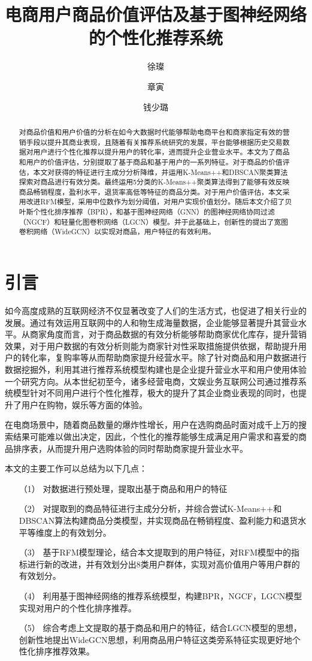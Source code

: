 \documentclass[lang=cn,11pt,a4paper,cite=authoryear]{elegantpaper}
\title{电商用户商品价值评估及基于图神经网络的个性化推荐系统}
\author{徐璨 \and 章寅 \and 钱少璐}
\institute{浙江工商大学}
\date{\zhtoday}
\begin{document}
\maketitle

\begin{abstract}
  对商品价值和用户价值的分析在如今大数据时代能够帮助电商平台和商家指定有效的营销手段以提升其商业表现，且随着有关推荐系统研究的发展，平台能够根据历史交易数据对用户进行个性化推荐以提升用户的转化率，进而提升企业营业水平。本文为了商品和用户的价值评估，分别提取了基于商品和基于用户的一系列特征。对于商品的价值评估，本文对获得的特征进行主成分分析降维，并运用K-Means++和DBSCAN聚类算法探索对商品进行有效分类。最终运用5分类的K-Means++聚类算法得到了能够有效反映商品畅销程度，盈利水平，退货率高低等特征的商品分类。对于用户价值评估，本文采用改进RFM模型，采用中位数作为划分阈值，对用户实现价值划分。随后本文介绍了贝叶斯个性化排序推荐（BPR），和基于图神经网络（GNN）的图神经网络协同过滤（NGCF）和轻量化图卷积网络（LGCN）模型。并于此基础上，创新性的提出了宽图卷积网络（WideGCN）以实现对商品，用户特征的有效利用。
\end{abstract}


\section{引言}
如今高度成熟的互联网经济不仅显著改变了人们的生活方式，也促进了相关行业的发展。通过有效运用互联网中的人和物生成海量数据，企业能够显著提升其营业水平。从商家角度而言，对于商品数据的有效分析能够帮助商家优化库存，提升营销效果，对于用户数据的有效分析则能为商家针对性采取措施提供依据，帮助提升用户的转化率，复购率等从而帮助商家提升经营水平。除了针对商品和用户数据进行数据挖掘外，利用其进行推荐系统模型构建也是企业提升营业水平和用户使用体验一个研究方向。从本世纪初至今，诸多经营电商，文娱业务互联网公司通过推荐系统模型针对不同用户进行个性化推荐，极大的提升了其企业商业表现的同时，也提升了用户在购物，娱乐等方面的体验。

在电商场景中，随着商品数量的爆炸性增长，用户在选购商品时面对成千上万的搜索结果可能难以做出决定，因此，个性化的推荐能够生成满足用户需求和喜爱的商品排序表，从而提升用户选购体验的同时帮助商家提升营业水平。

本文的主要工作可以总结为以下几点：

\begin{itemize}
  \item [（1）] 
  对数据进行预处理，提取出基于商品和用户的特征
  \item [（2）]
  对提取到的商品特征进行主成分分析，并综合尝试K-Means++和DBSCAN算法构建商品分类模型，并实现商品在畅销程度、盈利能力和退货水平等维度上的有效划分。
  \item [（3）]
  基于RFM模型理论，结合本文提取到的用户特征，对RFM模型中的指标进行新的改进，并有效划分出8类用户群体，实现对高价值用户等用户群的有效划分。
  \item[（4）]
  利用基于图神经网络的推荐系统模型，构建BPR，NGCF，LGCN模型实现对用户的个性化排序推荐。
  \item[（5）]
  综合考虑上文提取的基于商品和用户的特征，结合LGCN模型的思想，创新性地提出WideGCN思想，利用商品用户特征这类旁系特征实现更好地个性化排序推荐效果。 
\end{itemize}
\end{document}
